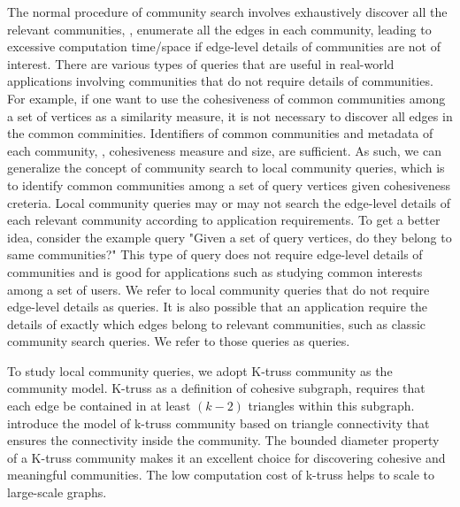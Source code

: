 The normal procedure of community search involves exhaustively discover all the relevant communities, \ie, enumerate all the edges in each community, leading to excessive computation time/space if edge-level details of communities are not of interest. There are various types of queries that are useful in real-world applications involving communities that do not require details of communities. For example, if one want to use the cohesiveness of common communities among a set of vertices as a similarity measure, it is not necessary to discover all edges in the common comminities. Identifiers of common communities and metadata of each community, \eg, cohesiveness measure and size, are sufficient. As such, we can generalize the concept of community search to local community queries, which is to identify common communities among a set of query vertices given cohesiveness creteria. Local community queries may or may not search the edge-level details of each relevant community according to application requirements. To get a better idea, consider the example query "Given a set of query vertices, do they belong to same communities?" This type of query does not require edge-level details of communities and is good for applications such as studying common interests among a set of users. We refer to local community queries that do not require edge-level details as \toplevelprob{} queries. It is also possible that an application require the details of exactly which edges belong to relevant communities, such as classic community search queries. We refer to those queries as \bottomlevelprob{} queries.

To study local community queries, we adopt K-truss community as the community model. K-truss as a definition of cohesive subgraph, requires that each edge be contained in at least $(k - 2)$ triangles within this subgraph. \cite{huang2014querying} introduce the model of k-truss community based on triangle connectivity that ensures the connectivity inside the community. The bounded diameter property of a K-truss community makes it an excellent choice for discovering cohesive and meaningful communities. The low computation cost of k-truss helps to scale to large-scale graphs.

